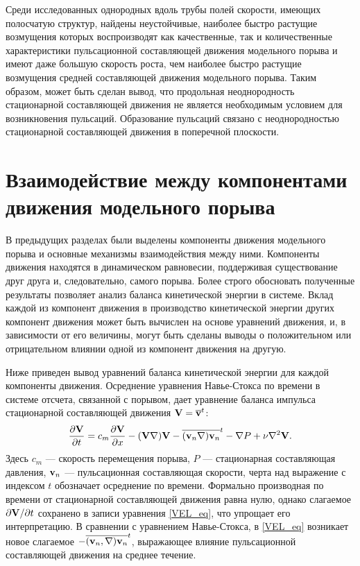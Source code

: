Среди исследованных однородных вдоль трубы полей скорости, имеющих полосчатую структур, найдены неустойчивые, наиболее быстро растущие возмущения которых воспроизводят как качественные, так и количественные характеристики пульсационной составляющей движения модельного порыва и имеют даже большую скорость роста, чем наиболее быстро растущие возмущения средней составляющей движения модельного порыва. Таким образом, может быть сделан вывод, что продольная неоднородность стационарной составляющей движения не является необходимым условием для возникновения пульсаций. Образование пульсаций связано с неоднородностью стационарной составляющей движения в поперечной плоскости. 


\section{Взаимодействие между компонентами движения модельного порыва}

В предыдущих разделах были выделены компоненты движения модельного порыва и основные механизмы взаимодействия между ними. Компоненты движения находятся в динамическом равновесии, поддерживая существование друг друга и, следовательно, самого порыва. Более строго обосновать полученные результаты позволяет анализ баланса кинетической энергии в системе. Вклад каждой из компонент движения в производство кинетической энергии других компонент движения может быть вычислен на основе уравнений движения, и, в зависимости от его величины, могут быть сделаны выводы о положительном или отрицательном влиянии одной из компонент движения на другую. 

Ниже приведен вывод уравнений баланса кинетической энергии для каждой компоненты движения. 
Осреднение уравнения Навье-Стокса по времени в системе отсчета, связанной с порывом, дает уравнение баланса импульса стационарной составляющей движения $\mathbf{V} = \overline{\mathbf{v}}^t$:
\begin{equation} \label{VEL_eq}
\frac{\partial \mathbf{V}}{\partial t} = c_m \frac{\partial \mathbf{V}}{\partial x} - (\mathbf{V} \nabla) \mathbf{V} - \overline{(\mathbf{v}_n \nabla) \mathbf{v}_n}^t - \nabla P + \nu \nabla^2 \mathbf{V}.
\end{equation}
Здесь $c_m$ --- скорость перемещения порыва, $P$ --- стационарная составляющая давления, $\mathbf{v}_n$ --- пульсационная составляющая скорости, черта над выражение с индексом $t$ обозначает осреднение по времени. Формально производная по времени от стационарной составляющей движения равна нулю, однако слагаемое $\partial \mathbf{V}/ \partial t$ сохранено в записи уравнения \eqref{VEL_eq}, что упрощает его интерпретацию. В сравнении с уравнением Навье-Стокса, в \eqref{VEL_eq} возникает новое слагаемое $-\overline{(\mathbf{v}_n, \nabla) \mathbf{v}_n}^t$, выражающее влияние пульсационной составляющей движения на среднее течение. 

